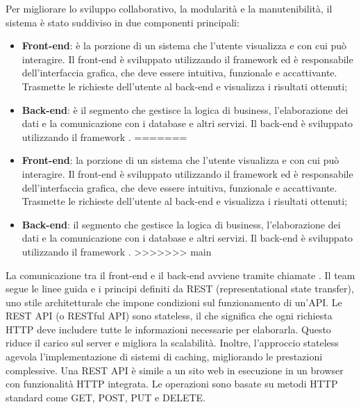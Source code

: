 \par Per migliorare lo sviluppo collaborativo, la modularità e la manutenibilità, il sistema è stato suddiviso in due componenti principali:
\begin{itemize}
<<<<<<< HEAD
  \item \textbf{Front-end}: è la porzione di un sistema che l'utente visualizza e con cui può interagire. Il front-end è sviluppato utilizzando il framework  ed è responsabile dell'interfaccia grafica, che deve essere intuitiva, funzionale e accattivante. Trasmette le richieste dell'utente al back-end e visualizza i risultati ottenuti;
  \item \textbf{Back-end}: è il segmento che gestisce la logica di business, l'elaborazione dei dati e la comunicazione con i database e altri servizi. Il back-end è sviluppato utilizzando il framework .
=======
  \item \textbf{Front-end}: la porzione di un sistema che l'utente visualizza e con cui può interagire. Il front-end è sviluppato utilizzando il framework  ed è responsabile dell'interfaccia grafica, che deve essere intuitiva, funzionale e accattivante. Trasmette le richieste dell'utente al back-end e visualizza i risultati ottenuti;
  \item \textbf{Back-end}: il segmento che gestisce la logica di business, l'elaborazione dei dati e la comunicazione con i database e altri servizi. Il back-end è sviluppato utilizzando il framework .
>>>>>>> main
\end{itemize}

\vspace{0.5\baselineskip}
\par La comunicazione tra il front-end e il back-end avviene tramite chiamate . Il team segue le linee guida e i principi definiti da REST (representational state transfer), uno stile architetturale che impone condizioni sul funzionamento di un'API. Le REST API (o RESTful API) sono stateless, il che significa che ogni richiesta HTTP deve includere tutte le informazioni necessarie per elaborarla. Questo riduce il carico sul server e migliora la scalabilità. Inoltre, l’approccio stateless agevola l'implementazione di sistemi di caching, migliorando le prestazioni complessive. Una REST API è simile a un sito web in esecuzione in un browser con funzionalità HTTP integrata. Le operazioni sono basate su metodi HTTP standard come GET, POST, PUT e DELETE.

